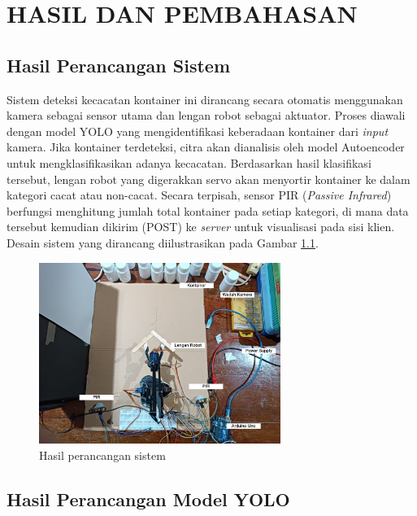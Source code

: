 \chapter{HASIL DAN PEMBAHASAN}
\section{Hasil Perancangan Sistem}
Sistem deteksi kecacatan kontainer ini dirancang secara otomatis
menggunakan kamera sebagai sensor utama dan lengan robot sebagai
aktuator. Proses diawali dengan model YOLO yang mengidentifikasi
keberadaan kontainer dari \textit{input} kamera. Jika kontainer terdeteksi,
citra akan dianalisis oleh model Autoencoder untuk mengklasifikasikan
adanya kecacatan. Berdasarkan hasil klasifikasi tersebut, lengan
robot yang digerakkan servo akan menyortir kontainer ke dalam
kategori cacat atau non-cacat. Secara terpisah, sensor PIR
(\textit{Passive Infrared}) berfungsi menghitung jumlah total
kontainer pada setiap kategori, di mana data tersebut kemudian
dikirim (POST) ke \textit{server} untuk visualisasi pada sisi klien. Desain
sistem yang dirancang diilustrasikan pada Gambar \ref{fig:rancang-sistem}.

\begin{figure}[H]
  \centering
  \includegraphics[width=0.7\textwidth]{gambar/rancang_sistem.jpg}
  \caption{Hasil perancangan sistem}
  \label{fig:rancang-sistem}
\end{figure}
\vspace{-1em}

\vspace{1em}

\section{Hasil Perancangan Model YOLO}
